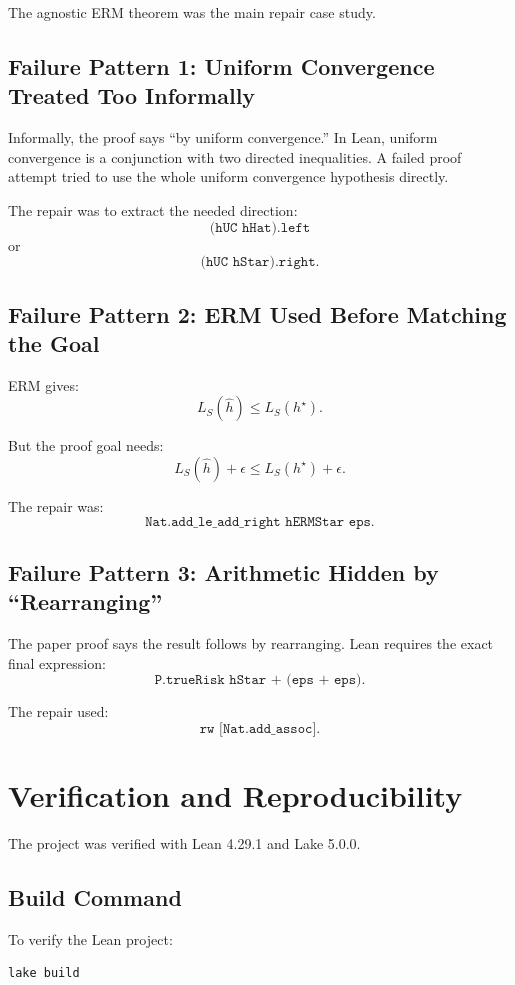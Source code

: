 \documentclass[11pt]{article}
\newcommand{\LS}{L_S}
\newcommand{\hh}{\widehat{h}}
\newcommand{\hstar}{h^\star}
\newcommand{\eps}{\epsilon}
\theoremstyle{definition}
\begin{document}
The agnostic ERM theorem was the main repair case study.

\subsection{Failure Pattern 1: Uniform Convergence Treated Too Informally}

Informally, the proof says ``by uniform convergence.'' In Lean, uniform
convergence is a conjunction with two directed inequalities. A failed proof
attempt tried to use the whole uniform convergence hypothesis directly.

The repair was to extract the needed direction:
\[
  \texttt{(hUC hHat).left}
\]
or
\[
  \texttt{(hUC hStar).right}.
\]

\subsection{Failure Pattern 2: ERM Used Before Matching the Goal}

ERM gives:
\[
  \LS(\hh)\le \LS(\hstar).
\]

But the proof goal needs:
\[
  \LS(\hh)+\eps\le \LS(\hstar)+\eps.
\]

The repair was:
\[
  \texttt{Nat.add\_le\_add\_right hERMStar eps}.
\]

\subsection{Failure Pattern 3: Arithmetic Hidden by ``Rearranging''}

The paper proof says the result follows by rearranging. Lean requires the exact
final expression:
\[
  \texttt{P.trueRisk hStar + (eps + eps)}.
\]

The repair used:
\[
  \texttt{rw [Nat.add\_assoc]}.
\]

\section{Verification and Reproducibility}

The project was verified with Lean 4.29.1 and Lake 5.0.0.

\subsection{Build Command}

To verify the Lean project:

\begin{verbatim}
lake build
\end{verbatim}
\end{document}
